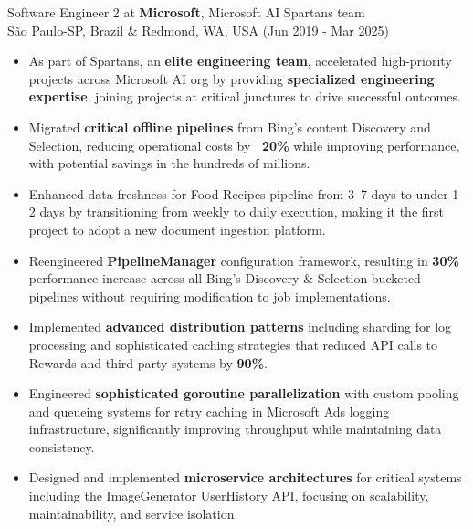 
\normalsize{Software Engineer 2 at \textbf{Microsoft}, Microsoft AI Spartans team}\\
        \scriptsize{São Paulo-SP, Brazil \& Redmond, WA, USA (Jun 2019 - Mar 2025)}
\begin{itemize}
    \item \scriptsize{As part of Spartans, an \textbf{elite engineering team}, accelerated high-priority projects across Microsoft AI org by providing \textbf{specialized engineering expertise}, joining projects at critical junctures to drive successful outcomes.}
    
    \item \scriptsize{Migrated \textbf{critical offline pipelines} from Bing's content Discovery and Selection, reducing operational costs by \textbf{~20\%} while improving performance, with potential savings in the hundreds of millions.}
    
    \item \scriptsize{Enhanced data freshness for Food Recipes pipeline from 3–7 days to under 1–2 days by transitioning from weekly to daily execution, making it the first project to adopt a new document ingestion platform.}
    
    \item \scriptsize{Reengineered \textbf{PipelineManager} configuration framework, resulting in \textbf{30\%} performance increase across all Bing's Discovery \& Selection bucketed pipelines without requiring modification to job implementations.}
    
    \item \scriptsize{Implemented \textbf{advanced distribution patterns} including sharding for log processing and sophisticated caching strategies that reduced API calls to Rewards and third-party systems by \textbf{90\%}.}
    
    \item \scriptsize{Engineered \textbf{sophisticated goroutine parallelization} with custom pooling and queueing systems for retry caching in Microsoft Ads logging infrastructure, significantly improving throughput while maintaining data consistency.}
    
    \item \scriptsize{Designed and implemented \textbf{microservice architectures} for critical systems including the ImageGenerator UserHistory API, focusing on scalability, maintainability, and service isolation.}
    

\end{itemize}
